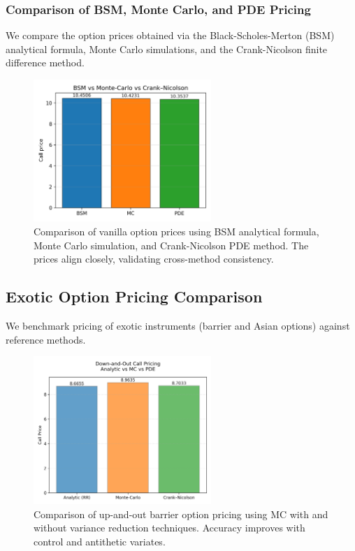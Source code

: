 \documentclass[12pt,a4paper]{article}
\begin{document}
\subsubsection{Comparison of BSM, Monte Carlo, and PDE Pricing}

We compare the option prices obtained via the Black-Scholes-Merton (BSM) analytical formula, Monte Carlo simulations, and the Crank-Nicolson finite difference method.

\begin{figure}[H]
    \centering
    \includegraphics[width=0.6\textwidth]{../plots/BSM_MC_CN_Comparison.png}
    \caption{Comparison of vanilla option prices using BSM analytical formula, Monte Carlo simulation, and Crank-Nicolson PDE method. The prices align closely, validating cross-method consistency.}
    \label{fig:bsm_mc_cn_comparison}
\end{figure}

\subsection{Exotic Option Pricing Comparison}

We benchmark pricing of exotic instruments (barrier and Asian options) against reference methods.

\begin{figure}[H]
    \centering
    \includegraphics[width=0.6\textwidth]{../plots/barrier_price_compare.png}
    \caption{Comparison of up-and-out barrier option pricing using MC with and without variance reduction techniques. Accuracy improves with control and antithetic variates.}
\end{figure}
\newpage
\end{document}
